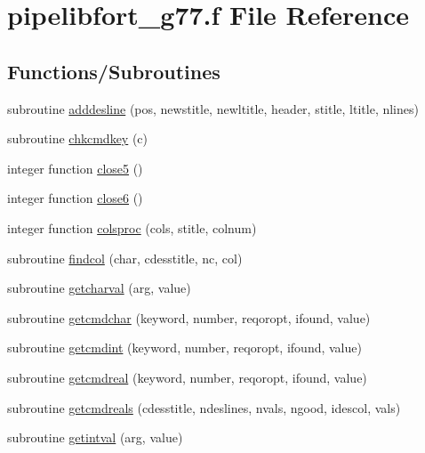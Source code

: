\hypertarget{pipelibfort__g77_8f}{\section{pipelibfort\-\_\-g77.\-f File Reference}
\label{pipelibfort__g77_8f}
}
\subsection*{Functions/\-Subroutines}
\begin{DoxyCompactItemize}
\item 
subroutine \hyperlink{pipelibfort__g77_8f_aeaae93b6dc684342c79487a745a99a51}{adddesline} (pos, newstitle, newltitle, header, stitle, ltitle, nlines)
\item 
subroutine \hyperlink{pipelibfort__g77_8f_a8a8336a9de43f7daefefb8ac9ba79fac}{chkcmdkey} (c)
\item 
integer function \hyperlink{pipelibfort__g77_8f_ac98fc153e9cc6c46cd09a4bcbae2dae6}{close5} ()
\item 
integer function \hyperlink{pipelibfort__g77_8f_a02f39a677a711c769bbd2fe8c22e4f2e}{close6} ()
\item 
integer function \hyperlink{pipelibfort__g77_8f_afe940e5adaa17f7cdb0081228000d09a}{colsproc} (cols, stitle, colnum)
\item 
subroutine \hyperlink{pipelibfort__g77_8f_a61b134a644292f1f143d10d073d9cb78}{findcol} (char, cdesstitle, nc, col)
\item 
subroutine \hyperlink{pipelibfort__g77_8f_acf76d7e0af8a4d1e7a1b8d50d4739390}{getcharval} (arg, value)
\item 
subroutine \hyperlink{pipelibfort__g77_8f_ac1c58de61b7ee46ab7166316e1ea8c46}{getcmdchar} (keyword, number, reqoropt, ifound, value)
\item 
subroutine \hyperlink{pipelibfort__g77_8f_a567b5ca9b7bd0af6eedf1c988db9e706}{getcmdint} (keyword, number, reqoropt, ifound, value)
\item 
subroutine \hyperlink{pipelibfort__g77_8f_aaa68fe2ce6013f2cba27f4cf85dbb29b}{getcmdreal} (keyword, number, reqoropt, ifound, value)
\item 
subroutine \hyperlink{pipelibfort__g77_8f_a9129bdbde4a26040a37c118c0b7334b5}{getcmdreals} (cdesstitle, ndeslines, nvals, ngood, idescol, vals)
\item 
subroutine \hyperlink{pipelibfort__g77_8f_a2d8503979198b8f2448f729e5683a394}{getintval} (arg, value)
\item 

\end{DoxyCompactItemize}
